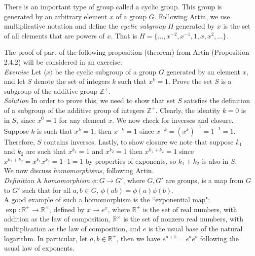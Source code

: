 There is an important type of group called a cyclic group.  This group is generated by an arbitrary element $x$ of  a group $G$.  Following Artin, we use multiplicative notation and define the \textit{cyclic subgroup} $H$ generated by $x$ is the set of all elements that are powers of $x$.  That is $H = \{\ldots, x^{-2}, x^{-1}, 1, x, x^{2}, \ldots \}$.

The proof of part of the following proposition (theorem) from Artin (Proposition 2.4.2) will be considered in an exercise:\\

\textit{Exercise} Let $\langle x \rangle$ be the cyclic subgroup of a group $G$ generated by an element $x$, and let $S$ denote the set of integers $k$ such that $x^{k}=1$.  Prove the set $S$ is a subgroup of the additive group $\mathbb{Z}^{+}$.\\

\textit{Solution} In order to prove this, we need to show that set $S$ satisfies the definition of a subgroup of the additive group of integers $\mathbb{Z}^{+}.$  Clearly, the identity $k=0$ is in $S$, since $x^{0}=1$ for any element $x$.  We now check for inverses and closure.  Suppose $k$ is such that $x^{k}=1$, then $x^{-k}=1$ since $x^{-k}=(x^{k})^{-1}=1^{-1}=1$.  Therefore, $S$ contains inverses.  Lastly, to show closure we note that suppose $k_{1}$ and $k_{2}$ are such that $x^{k_{1}}=1$ and $x^{k_{2}}=1$ then $x^{k_{1}+k_{2}}=1$ since $x^{k_{1}+k_{2}}=x^{k_{1}}x^{k_{2}}=1 \cdot 1=1$ by properties of exponents, so $k_{1}+k_{2}$ is also in $S$.\\

We now discuss \textit{homomorphisms}, following Artin.\\  

\textit{Definition} A \textit{homomorphism} $\phi: G \rightarrow G'$, where $G,G'$ are groups, is a map from $G$ to $G'$ such that for all $a,b \in G$, $\phi(ab)=\phi(a)\phi(b)$.\\

A good example of such a homomorphism is the ``exponential map": $\exp:\mathbb{\mathbb{R}^{+}} \rightarrow \mathbb{R}^{\times}$, defined by $x \rightarrow e^{x}$, where $\mathbb{R}^{+}$ is the set of real numbers, with addition as the law of composition, $\mathbb{R}^{\times}$ is the set of nonzero real numbers, with multiplication as the law of composition, and $e$ is the usual base of the natural logarithm.  In particular, let $a,b \in \mathbb{R}^{+}$, then we have $e^{a+b}=e^{a}e^{b}$ following the usual law of exponents.\\

